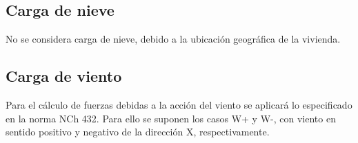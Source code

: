 \subsection{Carga de nieve}

No se considera carga de nieve, debido a la ubicación geográfica de la vivienda.

\subsection{Carga de viento}

Para el cálculo de fuerzas debidas a la acción del viento se aplicará lo especificado en la norma NCh 432. Para ello se suponen los casos W+ y W-, con viento en sentido positivo y negativo de la dirección X, respectivamente. 

